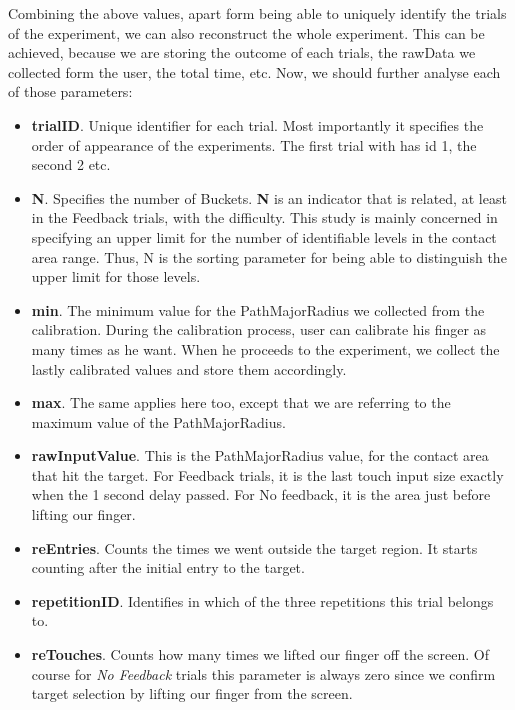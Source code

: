Combining the above values, apart form being able to uniquely identify the trials of the experiment, we can also reconstruct the whole experiment. This can be achieved, because we are storing the outcome of each trials, the rawData we collected form the user, the total time, etc. Now, we should further analyse each of those parameters:

\begin{itemize}
	\item \textbf{trialID}. Unique identifier for each trial. Most importantly it specifies the order of appearance of the experiments. The first trial with has id 1, the second 2 etc. 

	\item \textbf{N}. Specifies the number of Buckets. \textbf{N} is an indicator that is related, at least in the Feedback trials, with the difficulty. This study is mainly concerned in specifying an upper limit for the number of identifiable levels in the contact area range. Thus, N is the sorting parameter for being able to distinguish the upper limit for those levels. 
	
	\item \textbf{min}. The minimum value for the PathMajorRadius we collected from the calibration. During the calibration process, user can calibrate his finger as many times as he want. When he proceeds to the experiment, we collect the lastly calibrated values and store them accordingly.
	
	\item \textbf{max}. The same applies here too, except that we are referring to the maximum value of the PathMajorRadius.  
	
	\item \textbf{rawInputValue}. This is the PathMajorRadius value, for the contact area that hit the target. For Feedback trials, it is the last touch input size exactly when the 1 second delay passed. For No feedback, it is the area just before lifting our finger.
	
	\item \textbf{reEntries}. Counts the times we went outside the target region. It starts counting after the initial entry to the target.
	
	\item \textbf{repetitionID}. Identifies in which of the three repetitions this trial belongs to.  
	
	\item \textbf{reTouches}. Counts how many times we lifted our finger off the screen. Of course for \emph{No Feedback} trials this parameter is always zero since we confirm target selection by lifting our finger from the screen.
	

\end{itemize}
